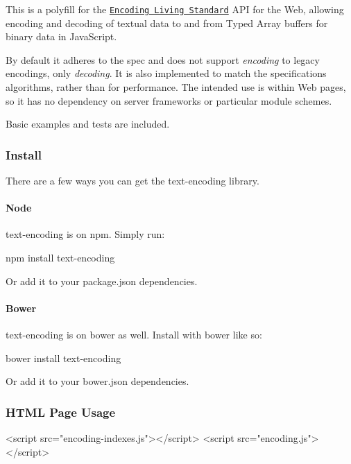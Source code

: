 This is a polyfill for the \href{https://encoding.spec.whatwg.org/}{\tt Encoding Living Standard} A\+PI for the Web, allowing encoding and decoding of textual data to and from Typed Array buffers for binary data in Java\+Script.

By default it adheres to the spec and does not support {\itshape encoding} to legacy encodings, only {\itshape decoding}. It is also implemented to match the specification\textquotesingle{}s algorithms, rather than for performance. The intended use is within Web pages, so it has no dependency on server frameworks or particular module schemes.

Basic examples and tests are included.

\subsubsection*{Install}

There are a few ways you can get the {\ttfamily text-\/encoding} library.

\paragraph*{Node}

{\ttfamily text-\/encoding} is on {\ttfamily npm}. Simply run\+:


\begin{DoxyCode}
npm install text-encoding
\end{DoxyCode}


Or add it to your {\ttfamily package.\+json} dependencies.

\paragraph*{Bower}

{\ttfamily text-\/encoding} is on {\ttfamily bower} as well. Install with bower like so\+:


\begin{DoxyCode}
bower install text-encoding
\end{DoxyCode}


Or add it to your {\ttfamily bower.\+json} dependencies.

\subsubsection*{H\+T\+ML Page Usage}


\begin{DoxyCode}
<script src="encoding-indexes.js"></script>
<script src="encoding.js"></script>
\end{DoxyCode}


